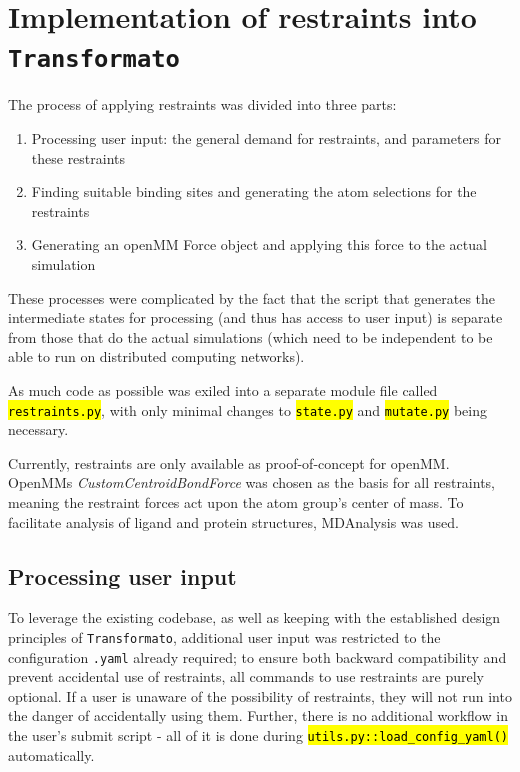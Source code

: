 \documentclass[oneside]{scrreprt}
\newcommand{\code}[1]{\texttt{\hl{#1}}}
\begin{document}
\section{Implementation of restraints into \texttt{Transformato}}\label{sec:implementation_restraints}

The process of applying restraints was divided into three parts:

\begin{enumerate}
    \item Processing user input: the general demand for restraints, and parameters for these restraints
    \item Finding suitable binding sites and generating the atom selections for the restraints
    \item Generating an openMM Force object and applying this force to the actual simulation

\end{enumerate}

These processes were complicated by the fact that the script that generates the intermediate states for processing (and thus has access to user input) is separate from those that do the actual simulations (which need to be independent to be able to run on distributed computing networks).



 As much code as possible was exiled into a separate module file called \code{restraints.py}, with only minimal changes to \code{state.py} and \code{mutate.py} being necessary. 

Currently, restraints are only available as proof-of-concept for openMM. OpenMMs \emph{CustomCentroidBondForce} was chosen as the basis for all restraints, meaning the restraint forces act upon the atom group's center of mass. To facilitate analysis of ligand and protein structures, MDAnalysis\cite{agrawal2011,oliver_beckstein-proc-scipy-2016} was used.

\subsection{Processing user input}
To leverage the existing codebase, as well as keeping with the established design principles of \texttt{Transformato}, additional user input was restricted to the configuration \texttt{.yaml} already required; to ensure both backward compatibility and prevent accidental use of restraints, all commands to use restraints are purely optional. If a user is unaware of the possibility of restraints, they will not run into the danger of accidentally using them. Further, there is no additional workflow in the user's submit script - all of it is done during \code{utils.py::load\_config\_yaml()} automatically.
\end{document}
